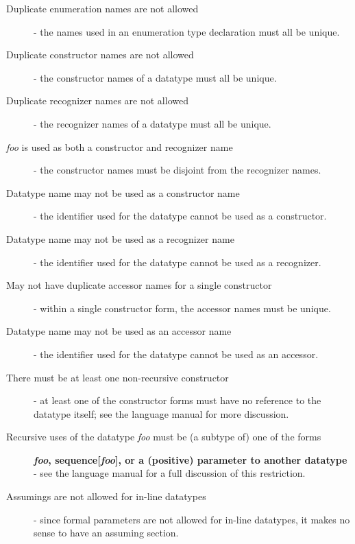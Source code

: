 \begin{description}

\item[Duplicate enumeration names are not allowed] - the names used in an
enumeration type declaration must all be unique.

\item[Duplicate constructor names are not allowed] - the constructor names
of a datatype must all be unique.

\item[Duplicate recognizer names are not allowed] - the recognizer names
of a datatype must all be unique.

\item[{\em foo} is used as both a constructor and recognizer name] - the
constructor names must be disjoint from the recognizer names.

\item[Datatype name may not be used as a constructor name] - the
identifier used for the datatype cannot be used as a constructor.

\item[Datatype name may not be used as a recognizer name] - the
identifier used for the datatype cannot be used as a recognizer.

\item[May not have duplicate accessor names for a single constructor] -
within a single constructor form, the accessor names must be unique.

\item[Datatype name may not be used as an accessor name] - the
identifier used for the datatype cannot be used as an accessor.

\item[There must be at least one non-recursive constructor] - at least one
of the constructor forms must have no reference to the datatype itself;
see the language manual for more discussion.

\item[Recursive uses of the datatype {\em foo\/} must be (a subtype of)
one of the forms] \textbf{\emph{foo}, sequence[\emph{foo}], or a
(positive) parameter to another datatype} - see the language manual for a
full discussion of this restriction.

\item[Assumings are not allowed for in-line datatypes] - since formal
parameters are not allowed for in-line datatypes, it makes no sense to
have an assuming section.

\end{description}


